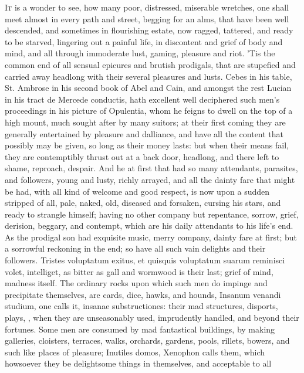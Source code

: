 {\lettrine{I}{t} is a wonder to see, how many poor, distressed, miserable wretches,
one shall meet almost in every path and street, begging for an alms,
that have been well descended, and sometimes in flourishing estate, now
ragged, tattered, and ready to be starved, lingering out a painful
life, in discontent and grief of body and mind, and all through
immoderate lust, gaming, pleasure and riot. 'Tis the common end of all
sensual epicures and brutish prodigals, that are stupefied and carried
away headlong with their several pleasures and lusts. Cebes in his
table, St. Ambrose in his second book of Abel and Cain, and amongst the
rest Lucian in his tract de Mercede conductis, hath excellent well
deciphered such men's proceedings in his picture of Opulentia, whom he
feigns to dwell on the top of a high mount, much sought after by many
suitors; at their first coming they are generally entertained by
pleasure and dalliance, and have all the content that possibly may be
given, so long as their money lasts: but when their means fail, they
are contemptibly thrust out at a back door, headlong, and there left to
shame, reproach, despair. And he at first that had so many attendants,
parasites, and followers, young and lusty, richly arrayed, and all the
dainty fare that might be had, with all kind of welcome and good
respect, is now upon a sudden stripped of all, pale, naked, old,
diseased and forsaken, cursing his stars, and ready to strangle
himself; having no other company but repentance, sorrow, grief,
derision, beggary, and contempt, which are his daily attendants to his
life's end. As the prodigal son had exquisite music, merry
company, dainty fare at first; but a sorrowful reckoning in the end; so
have all such vain delights and their followers. Tristes
voluptatum exitus, et quisquis voluptatum suarum reminisci volet,
intelliget, as bitter as gall and wormwood is their last; grief of
mind, madness itself. The ordinary rocks upon which such men do impinge
and precipitate themselves, are cards, dice, hawks, and hounds, Insanum
venandi studium, one calls it, insanae substructiones: their mad
structures, disports, plays, \etc{}, when they are unseasonably used,
imprudently handled, and beyond their fortunes. Some men are consumed
by mad fantastical buildings, by making galleries, cloisters, terraces,
walks, orchards, gardens, pools, rillets, bowers, and such like places
of pleasure; Inutiles domos, Xenophon calls them, which howsoever
they be delightsome things in themselves, and acceptable to all
}
